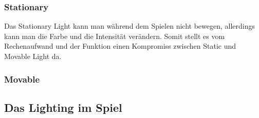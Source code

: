 \subsubsection{Stationary}
Das Stationary Light kann man während dem Spielen nicht bewegen, allerdings kann man die Farbe und die Intensität verändern. Somit stellt es vom Rechenaufwand und
der Funktion einen Kompromiss zwischen Static und Movable Light da. 

\subsubsection{Movable}

\subsection{Das Lighting im Spiel}